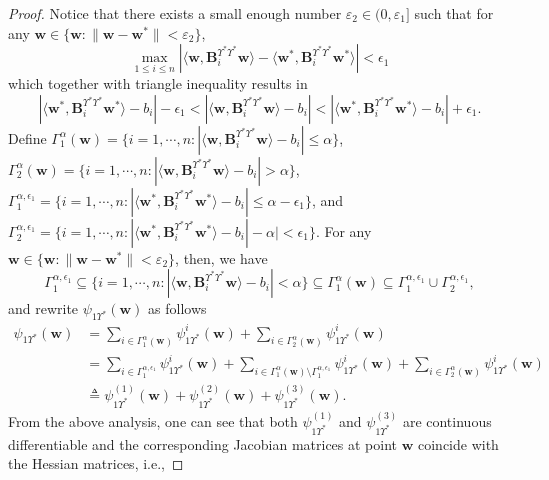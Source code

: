 \documentclass{article}
\numberwithin{equation}{section}
\begin{document}
\begin{proof}
Notice that there exists a small enough number $\varepsilon_2\in(0,\varepsilon_1]$ such that 
for any $\mathbf{w}\in\{\mathbf{w}: \|\mathbf{w}-\mathbf{w}^*\|<\varepsilon_2\}$,
$$\max_{1\leq i\leq n}|\langle\mathbf{w},\mathbf{B}_i^{\Upsilon^*\Upsilon^*}\mathbf{w}\rangle-\langle\mathbf{w}^*,\mathbf{B}_i^{\Upsilon^*\Upsilon^*}\mathbf{w}^*\rangle|<\epsilon_1$$
which together with triangle inequality results in 
$$|\langle\mathbf{w}^*,\mathbf{B}_i^{\Upsilon^*\Upsilon^*}\mathbf{w}^*\rangle-b_i|-\epsilon_1<|\langle\mathbf{w},\mathbf{B}_i^{\Upsilon^*\Upsilon^*}\mathbf{w}\rangle-b_i|<
|\langle\mathbf{w}^*,\mathbf{B}_i^{\Upsilon^*\Upsilon^*}\mathbf{w}^*\rangle-b_i|+\epsilon_1.$$
Define  $\Gamma_1^{\alpha}(\mathbf{w})=\{i=1,\cdots,n: |\langle\mathbf{w},\mathbf{B}_i^{\Upsilon^*\Upsilon^*}\mathbf{w}\rangle-b_i|\leq\alpha\}$,  $\Gamma_2^{\alpha}(\mathbf{w})=\{i=1,\cdots,n: |\langle\mathbf{w},\mathbf{B}_i^{\Upsilon^*\Upsilon^*}\mathbf{w}\rangle-b_i|>\alpha\}$, $\Gamma_1^{\alpha,\epsilon_1}=\{i=1,\cdots,n: |\langle\mathbf{w}^*,\mathbf{B}_i^{\Upsilon^*\Upsilon^*}\mathbf{w}^*\rangle-b_i|\leq\alpha-\epsilon_1\}$, and  $\Gamma_2^{\alpha,\epsilon_1}=\{i=1,\cdots,n: |\langle\mathbf{w}^*,\mathbf{B}_i^{\Upsilon^*\Upsilon^*}\mathbf{w}^*\rangle-b_i|-\alpha|<\epsilon_1\}$.
For any $\mathbf{w}\in\{\mathbf{w}: \|\mathbf{w}-\mathbf{w}^*\|<\varepsilon_2\}$, then, we have 
$$\Gamma_1^{\alpha,\epsilon_1}\subseteq\{i=1,\cdots,n: |\langle\mathbf{w},\mathbf{B}_i^{\Upsilon^*\Upsilon^*}\mathbf{w}\rangle-b_i|<\alpha\}\subseteq\Gamma_1^{\alpha}(\mathbf{w})
\subseteq\Gamma_1^{\alpha,\epsilon_1}\cup\Gamma_2^{\alpha,\epsilon_1},$$ and rewrite $\psi_{1\Upsilon^*}(\mathbf{w})$ as follows
\begin{equation}\nonumber
	\begin{aligned}\psi_{1\Upsilon^*}(\mathbf{w})&=\sum_{i\in\Gamma_1^{\alpha}(\mathbf{w})}\psi_{1\Upsilon^*}^i(\mathbf{w})
		+\sum_{i\in\Gamma_2^{\alpha}(\mathbf{w})}\psi_{1\Upsilon^*}^i(\mathbf{w})\\
		&=\sum_{i\in\Gamma_1^{\alpha,\epsilon_1}}\psi_{1\Upsilon^*}^i(\mathbf{w})+\sum_{i\in\Gamma_1^{\alpha}(\mathbf{w})\setminus\Gamma_1^{\alpha,\epsilon_1}}\psi_{1\Upsilon^*}^i(\mathbf{w})
		+\sum_{i\in\Gamma_2^{\alpha}(\mathbf{w})}\psi_{1\Upsilon^*}^i(\mathbf{w})\\
		&\triangleq \psi_{1\Upsilon^*}^{(1)}(\mathbf{w})+\psi_{1\Upsilon^*}^{(2)}(\mathbf{w})+\psi_{1\Upsilon^*}^{(3)}(\mathbf{w}).
\end{aligned}\end{equation}
From the above analysis, one can see that both $\psi_{1\Upsilon^*}^{(1)}$ and $\psi_{1\Upsilon^*}^{(3)}$ are continuous differentiable and the corresponding Jacobian matrices at point $\mathbf{w}$ coincide with the Hessian matrices, i.e.,

\end{proof}
\end{document}
